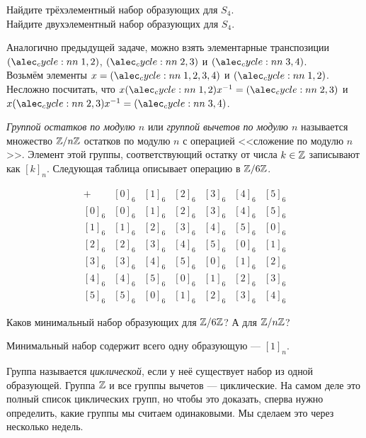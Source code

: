 \documentclass[a4paper,12pt]{article}
\begin{document}
    \problem \sub Найдите трёхэлементный набор образующих для $S_4$. \\
    \sub Найдите двухэлементный набор образующих для $S_4$.
    \begin{solution}
        \sub Аналогично предыдущей задаче, можно взять элементарные транспозиции $\cycle{1,2}$, $\cycle{2,3}$ и $\cycle{3,4}$. \\
        \sub Возьмём элементы $x = \cycle{1,2,3,4}$ и $\cycle{1,2}$. Несложно посчитать, что $x\cycle{1,2}x^{-1} = \cycle{2,3}$ и $x\cycle{2,3}x^{-1} = \cycle{3,4}$. 
    \end{solution}
    
     \emph{Группой остатков по модулю $n$} или \emph{группой вычетов по модулю $n$} называется множество $\mathbb{Z}/n\mathbb{Z}$ остатков по модулю $n$ с операцией <<сложение по модулю $n$>>. Элемент этой группы, соответствующий остатку от числа $k \in \mathbb{Z}$ записывают как $[k]_n$.
    \example Следующая таблица описывает операцию в $\mathbb{Z}/6\mathbb{Z}$.
    \begin{center}
        \begin{equation*}
        \newcommand{\tab}{\phantom{r_{240}}}
            \begin{array}{c||c|c|c|c|c|c}
                +     & [0]_6 & [1]_6 & [2]_6 & [3]_6 & [4]_6 & [5]_6 \\ \hline \hline
                [0]_6 & [0]_6 & [1]_6 & [2]_6 & [3]_6 & [4]_6 & [5]_6 \\ \hline
                [1]_6 & [1]_6 & [2]_6 & [3]_6 & [4]_6 & [5]_6 & [0]_6 \\ \hline
                [2]_6 & [2]_6 & [3]_6 & [4]_6 & [5]_6 & [0]_6 & [1]_6 \\ \hline
                [3]_6 & [3]_6 & [4]_6 & [5]_6 & [0]_6 & [1]_6 & [2]_6 \\ \hline
                [4]_6 & [4]_6 & [5]_6 & [0]_6 & [1]_6 & [2]_6 & [3]_6 \\ \hline
                [5]_6 & [5]_6 & [0]_6 & [1]_6 & [2]_6 & [3]_6 & [4]_6
            \end{array}
        \end{equation*}
    \end{center}
    \problem \sub Каков минимальный набор образующих для $\mathbb{Z}/6\mathbb{Z}$? \sub А для $\mathbb{Z}/n\mathbb{Z}$?
    \begin{solution}
        Минимальный набор содержит всего одну образующую --- $[1]_n$.
    \end{solution}
     Группа называется \emph{циклической}, если у неё существует набор из одной образующей.
    \example Группа $\mathbb{Z}$ и все группы вычетов --- циклические. На самом деле это полный список циклических групп, но чтобы это доказать, сперва нужно определить, какие группы мы считаем одинаковыми. Мы сделаем это через несколько недель.
    
\end{document}
